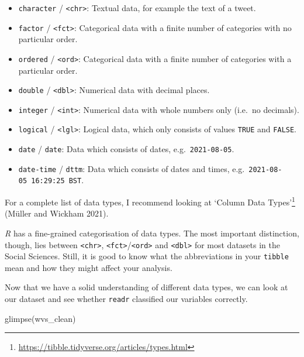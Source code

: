 \documentclass[
  letterpaper,
]{krantz}
\makeatletter
\newenvironment{Shaded}{\begin{snugshade}}{\end{snugshade}}
\newcommand{\FunctionTok}[1]{\textcolor[rgb]{0.28,0.35,0.67}{#1}}
\newcommand{\NormalTok}[1]{\textcolor[rgb]{0.00,0.23,0.31}{#1}}
\renewcommand{\href}[2]{#2\footnote{\url{#1}}}
\newenvironment{kframe}{%
\medskip{}
\setlength{\fboxsep}{.8em}
 \def\at@end@of@kframe{}%
 \ifinner\ifhmode%
  \def\at@end@of@kframe{\end{minipage}}%
  \begin{minipage}{\columnwidth}%
 \fi\fi%
 \def\FrameCommand##1{\hskip\@totalleftmargin \hskip-\fboxsep
 \colorbox{shadecolor}{##1}\hskip-\fboxsep
     \hskip-\linewidth \hskip-\@totalleftmargin \hskip\columnwidth}%
 \MakeFramed {\advance\hsize-\width
   \@totalleftmargin\z@ \linewidth\hsize
   \@setminipage}}%
 {\par\unskip\endMakeFramed%
 \at@end@of@kframe}
\renewenvironment{Shaded}{\begin{kframe}}{\end{kframe}}
\makeatother
\begin{document}
\begin{itemize}
\item
  \texttt{character} / \texttt{\textless{}chr\textgreater{}}: Textual
  data, for example the text of a tweet.
\item
  \texttt{factor} / \texttt{\textless{}fct\textgreater{}}: Categorical
  data with a finite number of categories with no particular order.
\item
  \texttt{ordered} / \texttt{\textless{}ord\textgreater{}}: Categorical
  data with a finite number of categories with a particular order.
\item
  \texttt{double} / \texttt{\textless{}dbl\textgreater{}}: Numerical
  data with decimal places.
\item
  \texttt{integer} / \texttt{\textless{}int\textgreater{}}: Numerical
  data with whole numbers only (i.e.~no decimals).
\item
  \texttt{logical} / \texttt{\textless{}lgl\textgreater{}}: Logical
  data, which only consists of values \texttt{TRUE} and \texttt{FALSE}.
\item
  \texttt{date} / \texttt{date}: Data which consists of dates,
  e.g.~\texttt{2021-08-05}.
\item
  \texttt{date-time} / \texttt{dttm}: Data which consists of dates and
  times, e.g.~\texttt{2021-08-05\ 16:29:25\ BST}.
\end{itemize}

For a complete list of data types, I recommend looking at
\href{https://tibble.tidyverse.org/articles/types.html}{`Column Data
Types'} (Müller and Wickham 2021).

\emph{R} has a fine-grained categorisation of data types. The most
important distinction, though, lies between
\texttt{\textless{}chr\textgreater{}},
\texttt{\textless{}fct\textgreater{}}/\texttt{\textless{}ord\textgreater{}}
and \texttt{\textless{}dbl\textgreater{}} for most datasets in the
Social Sciences. Still, it is good to know what the abbreviations in
your \texttt{tibble} mean and how they might affect your analysis.

Now that we have a solid understanding of different data types, we can
look at our dataset and see whether \texttt{readr} classified our
variables correctly.

\begin{Shaded}
\begin{Highlighting}[]
\FunctionTok{glimpse}\NormalTok{(wvs\_clean)}
\end{Highlighting}
\end{Shaded}
\end{document}

